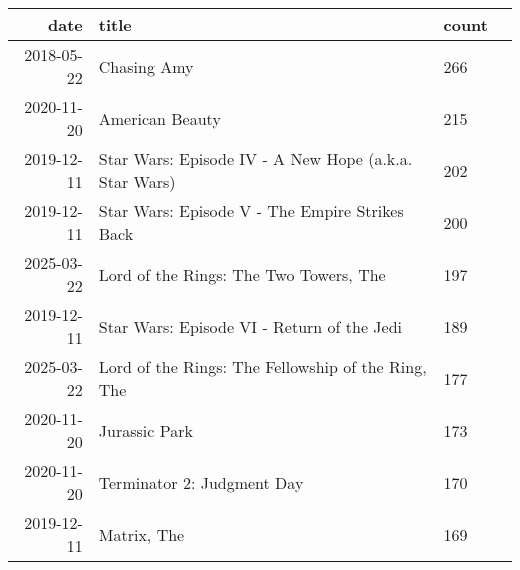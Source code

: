 \documentclass[11pt]{article}
\begin{document}
    \begin{tabular}{r|lll}
 date & title & count\\
\hline
	 2018-05-22                                                              & Chasing Amy                                                             & 266                                                                    \\
	 2020-11-20                                                              & American Beauty                                                         & 215                                                                    \\
	 2019-12-11                                                              & Star Wars: Episode IV - A New Hope (a.k.a. Star Wars)                   & 202                                                                    \\
	 2019-12-11                                                              & Star Wars: Episode V - The Empire Strikes Back                          & 200                                                                    \\
	 2025-03-22                                                              & Lord of the Rings: The Two Towers, The                                  & 197                                                                    \\
	 2019-12-11                                                              & Star Wars: Episode VI - Return of the Jedi                              & 189                                                                    \\
	 2025-03-22                                                              & Lord of the Rings: The Fellowship of the Ring, The                      & 177                                                                    \\
	 2020-11-20                                                              & Jurassic Park                                                           & 173                                                                    \\
	 2020-11-20                                                              & Terminator 2: Judgment Day                                              & 170                                                                    \\
	 2019-12-11                                                              & Matrix, The                                                             & 169                                                                    \\

\end{tabular}
\end{document}
